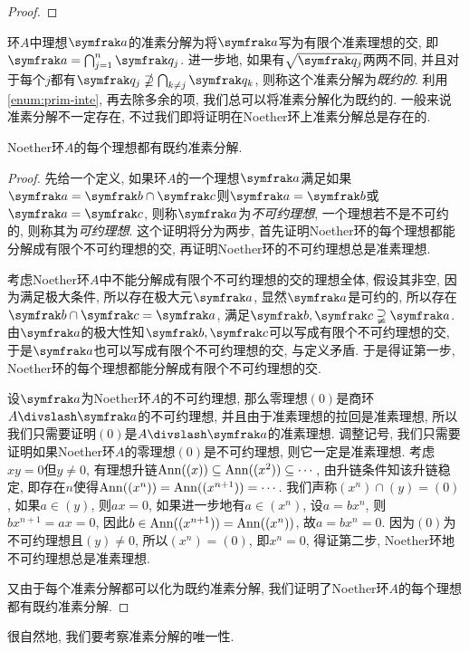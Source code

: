 \begin{proof}
\end{proof}

环$A$中理想$\ideal{a}$的准素分解为将$\ideal{a}$写为有限个准素理想的交, 即$\ideal{a}=\bigcap_{j=1}^n\ideal{q}_j$. 进一步地, 如果有$\sqrt{\ideal{q}_j}$两两不同, 并且对于每个$j$都有$\ideal{q}_j\nsupseteq\bigcap_{k\neq j}\ideal{q}_k$, 则称这个准素分解为\emph{既约的}. 利用\ref{enum:prim-inte}, 再去除多余的项, 我们总可以将准素分解化为既约的. 一般来说准素分解不一定存在, 不过我们即将证明在Noether环上准素分解总是存在的.

\begin{theorem}
    Noether环$A$的每个理想都有既约准素分解.
\end{theorem}

\begin{proof}
    先给一个定义, 如果环$A$的一个理想$\ideal{a}$满足如果$\ideal{a}=\ideal{b}\cap\ideal{c}$则$\ideal{a}=\ideal{b}$或$\ideal{a}=\ideal{c}$, 则称$\ideal{a}$为\emph{不可约理想}, 一个理想若不是不可约的, 则称其为\emph{可约理想}. 这个证明将分为两步, 首先证明Noether环的每个理想都能分解成有限个不可约理想的交, 再证明Noether环的不可约理想总是准素理想.

    考虑Noether环$A$中不能分解成有限个不可约理想的交的理想全体, 假设其非空, 因为满足极大条件, 所以存在极大元$\ideal{a}$, 显然$\ideal{a}$是可约的, 所以存在$\ideal{b}\cap\ideal{c}=\ideal{a}$, 满足$\ideal{b}, \ideal{c}\supsetneqq\ideal{a}$. 由$\ideal{a}$的极大性知$\ideal{b}, \ideal{c}$可以写成有限个不可约理想的交, 于是$\ideal{a}$也可以写成有限个不可约理想的交, 与定义矛盾. 于是得证第一步, Noether环的每个理想都能分解成有限个不可约理想的交.

    设$\ideal{a}$为Noether环$A$的不可约理想, 那么零理想$(0)$是商环$A{\divslash}\ideal{a}$的不可约理想, 并且由于准素理想的拉回是准素理想, 所以我们只需要证明$(0)$是$A{\divslash}\ideal{a}$的准素理想. 调整记号, 我们只需要证明如果Noether环$A$的零理想$(0)$是不可约理想, 则它一定是准素理想. 考虑$xy=0$但$y\neq 0$, 有理想升链$\operatorname{Ann}((x))\subseteq\operatorname{Ann}((x^2))\subseteq\dotsb$, 由升链条件知该升链稳定, 即存在$n$使得$\operatorname{Ann}((x^n))=\operatorname{Ann}((x^{n+1}))=\dotsb$. 我们声称$(x^n)\cap (y)=(0)$, 如果$a\in (y)$, 则$ax=0$, 如果进一步地有$a\in (x^n)$, 设$a=bx^n$, 则$bx^{n+1}=ax=0$, 因此$b\in\operatorname{Ann}((x^{n+1}))=\operatorname{Ann}((x^n))$, 故$a=bx^n=0$. 因为$(0)$为不可约理想且$(y)\neq 0$, 所以$(x^n)=(0)$, 即$x^n=0$, 得证第二步, Noether环地不可约理想总是准素理想.

    又由于每个准素分解都可以化为既约准素分解, 我们证明了Noether环$A$的每个理想都有既约准素分解.
\end{proof}

很自然地, 我们要考察准素分解的唯一性.
